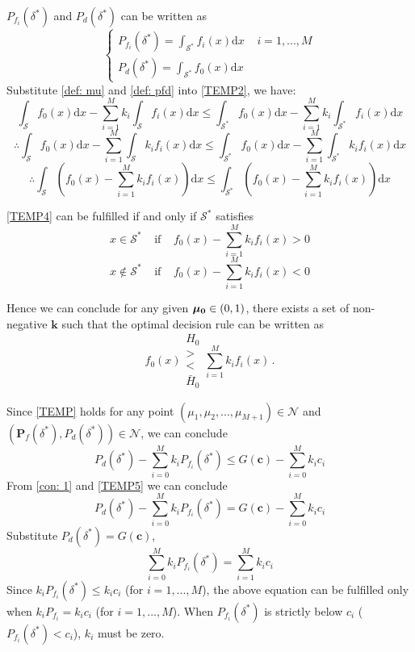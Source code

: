 $P_{f_i}(\delta^\ast)$ and $P_{d}(\delta^\ast)$ can be written as
\begin{equation}
\label{def: pfd}
\begin{cases}
P_{f_i}(\delta^\ast) = \int_{\mathcal{S}^\ast}f_i(x)\mathrm{d}x\;\;\;\;i=1, ..., M\\
P_d(\delta^\ast) = \int_{\mathcal{S}^\ast}f_0(x)\mathrm{d}x
\end{cases}
\end{equation}
Substitute \eqref{def: mu} and \eqref{def: pfd} into \eqref{TEMP2}, we have: 
\[
\int_{\mathcal{S}}f_{0}(x)\mathrm{d}x - \sum_{i=1}^{M}k_i\int_{\mathcal{S}}f_i(x)\mathrm{d}x \leq \int_{\mathcal{S}^\ast}f_{0}(x)\mathrm{d}x - \sum_{i=1}^{M}k_i\int_{\mathcal{S}^\ast}f_i(x)\mathrm{d}x
\]
\[
\therefore 
\int_{\mathcal{S}}f_{0}(x)\mathrm{d}x - \sum_{i=1}^{M}\int_{\mathcal{S}}k_if_i(x)\mathrm{d}x \leq \int_{\mathcal{S}^\ast}f_{0}(x)\mathrm{d}x - \sum_{i=1}^{M}\int_{\mathcal{S}^\ast}k_if_i(x)\mathrm{d}x
\]
\begin{equation}
\label{TEMP4}
\therefore \int_{\mathcal{S}}(f_{0}(x)- \sum_{i=1}^{M}k_if_{i}(x))\mathrm{d}x \leq \int_{\mathcal{S}^\ast}(f_{0}(x)- \sum_{i=1}^{M}k_if_{i}(x))\mathrm{d}x 
\end{equation}

\eqref{TEMP4} can be fulfilled if and only if $\mathcal{S}^\ast$ satisfies
\[
x \in \mathcal{S}^\ast\;\;\;\;\text{if}\;\;\;\;f_{0}(x)- \sum_{i=1}^{M}k_if_{i}(x) > 0
\]
\[
x \notin \mathcal{S}^\ast\;\;\;\;\text{if}\;\;\;\;f_{0}(x)- \sum_{i=1}^{M}k_if_{i}(x) < 0
\]

Hence we can conclude for any given $\mathbf{\boldsymbol{\mu}_0} \in (0, 1)$, there exists a set of non-negative $\mathbf{k}$ such that 
the optimal decision rule can be written as 
\[
f_0(x) \substack{H_0 \\ > \\ < \\ \bar{H}_0 } \sum_{i=1}^{M}k_if_i(x)\,.
\]

Since \eqref{TEMP} holds for any point $(\mu_1, \mu_2, ..., \mu_{M+1}) \in \mathcal{N}$ and $(\mathbf{P}_f(\delta^\ast), P_d(\delta^\ast)) \in \mathcal{N}$, we can conclude 
\begin{equation}
\label{TEMP5}
P_d(\delta^\ast) - \sum_{i=0}^{M}k_iP_{f_i}(\delta^\ast) \leq G(\mathbf{c}) - \sum_{i=0}^{M}k_ic_i
\end{equation}
From \eqref{con: 1} and \eqref{TEMP5}  we can conclude
\[
P_d(\delta^\ast) - \sum_{i=0}^{M}k_iP_{f_i}(\delta^\ast) =  G(\mathbf{c}) - \sum_{i=0}^{M}k_ic_i
\]
Substitute $P_d(\delta^\ast) = G(\mathbf{c})$,
\[
  \sum_{i=0}^{M}k_iP_{f_i}(\delta^\ast) =  \sum_{i=1}^{M}k_ic_i
\]
Since $k_iP_{f_i}(\delta^\ast) \leq k_ic_i$ (for $i=1, ..., M$), the above equation can be fulfilled only when $k_iP_{f_i} = k_ic_i$ (for $i=1, ..., M$). When $P_{f_i}(\delta^\ast)$ is strictly below $c_i$ ($P_{f_i}(\delta^\ast) < c_i$), $k_i$ must be zero.


